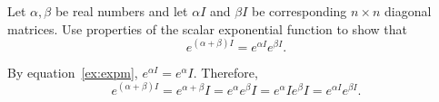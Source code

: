 \documentclass{ximera}
\begin{document}
\begin{computerExercise} \label{c6.2.5}
Let $\alpha,\beta$ be real numbers and let $\alpha I$ and $\beta
I$ be corresponding $n\times n$ diagonal matrices.  Use
properties of the scalar exponential function to show that
\[
     e^{(\alpha + \beta)I} = e^{\alpha I}e^{\beta I}.
\]

\begin{solution}

By equation~\eqref{ex:expm}, $e^{\alpha I} = e^\alpha I$.  Therefore,
\[ e^{(\alpha + \beta)I} = e^{\alpha + \beta}I = e^\alpha e^\beta I
= e^\alpha I e^\beta I = e^{\alpha I}e^{\beta I}. \]

\end{solution}
\end{computerExercise}
\end{document}
